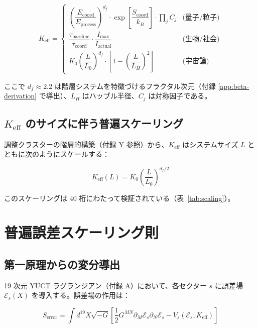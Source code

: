 \documentclass[12pt,a4paper]{article}
\newcommand{\Keff}{K_{\mathrm{eff}}}
\newcommand{\df}{d_{\!f}}
\theoremstyle{remark}
\begin{document}
	\begin{equation}
		\Keff = 
		\begin{cases}
			\left(\dfrac{E_{\text{coord}}}{E_{\text{process}}}\right)^{\df} \cdot \exp\left[\dfrac{S_{\text{coord}}}{k_B}\right] \cdot \prod_j C_j & \text{(量子/粒子)} \\[1em]
			\dfrac{\tau_{\text{baseline}}}{\tau_{\text{coord}}} \cdot \dfrac{I_{\text{max}}}{I_{\text{actual}}} & \text{(生物/社会)} \\[1em]
			K_0 \left(\dfrac{L}{L_0}\right)^{\df} \cdot \left[1 - \left(\dfrac{L}{L_H}\right)^2\right] & \text{(宇宙論)}
		\end{cases}
		\label{eq:keff-cases}
	\end{equation}
	
	ここで \(\df \approx 2.2\) は階層システムを特徴づけるフラクタル次元（付録 \ref{app:beta-derivation} で導出）、\(L_H\) はハッブル半径、\(C_j\) は対称因子である。
	
	\subsection{\(\Keff\) のサイズに伴う普遍スケーリング}
	
	調整クラスターの階層的構築（付録 Y 参照）から、\(\Keff\) はシステムサイズ \(L\) とともに次のようにスケールする：
	
	\begin{equation}
		\Keff(L) = K_0 \left(\frac{L}{L_0}\right)^{\df/2}
		\label{eq:keff-scaling}
	\end{equation}
	
	このスケーリングは 40 桁にわたって検証されている（表~\ref{tab:scaling}）。
	
	\section{普遍誤差スケーリング則}
	\label{sec:error-law}
	
	\subsection{第一原理からの変分導出}
	
	19 次元 YUCT ラグランジアン（付録 A）において、各セクター \(s\) に誤差場 \(\mathcal{E}_s(X)\) を導入する。誤差場の作用は：
	
	\begin{equation}
		S_{\text{error}} = \int d^{19}X \sqrt{-G} \left[ \frac{1}{2} G^{MN} \partial_M \mathcal{E}_s \partial_N \mathcal{E}_s - V_s(\mathcal{E}_s, \Keff) \right]
		\label{eq:error-action}
	\end{equation}
	
\end{document}
